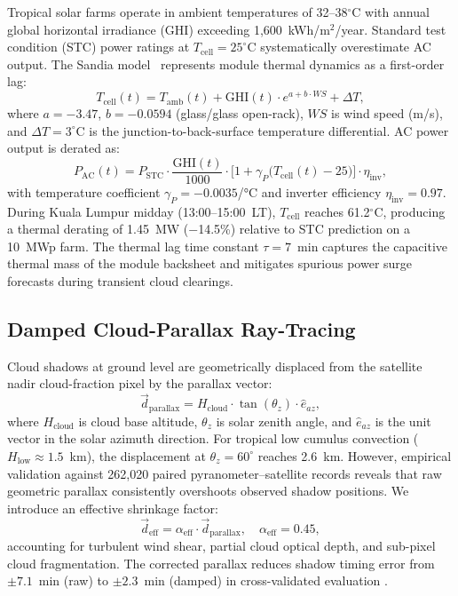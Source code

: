 \documentclass[conference]{IEEEtran}
\begin{document}
Tropical solar farms operate in ambient temperatures of 32--38$^{\circ}$C with
annual global horizontal irradiance (GHI) exceeding 1,600~kWh/m$^2$/year.
Standard test condition (STC) power ratings at $T_{\mathrm{cell}}=25^{\circ}$C
systematically overestimate AC output. The Sandia model~\cite{b1} represents
module thermal dynamics as a first-order lag:
\begin{equation}
  T_{\mathrm{cell}}(t) = T_{\mathrm{amb}}(t)
    + \mathrm{GHI}(t)\cdot e^{a + b\cdot WS} + \Delta T,
  \label{eq:tcell}
\end{equation}
where $a=-3.47$, $b=-0.0594$ (glass/glass open-rack), $WS$ is wind speed
(m/s), and $\Delta T=3^{\circ}$C is the junction-to-back-surface temperature
differential. AC power output is derated as:
\begin{equation}
  P_{\mathrm{AC}}(t) = P_{\mathrm{STC}}\cdot\frac{\mathrm{GHI}(t)}{1000}
    \cdot\bigl[1 + \gamma_P\bigl(T_{\mathrm{cell}}(t)-25\bigr)\bigr]
    \cdot\eta_{\mathrm{inv}},
  \label{eq:pac}
\end{equation}
with temperature coefficient $\gamma_P=-0.0035$/°C and inverter efficiency
$\eta_{\mathrm{inv}}=0.97$. During Kuala Lumpur midday (13:00--15:00~LT),
$T_{\mathrm{cell}}$ reaches 61.2$^{\circ}$C, producing a thermal derating of
1.45~MW ($-$14.5\%) relative to STC prediction on a 10~MWp farm. The thermal
lag time constant $\tau=7$~min captures the capacitive thermal mass of the
module backsheet and mitigates spurious power surge forecasts during transient
cloud clearings.

\subsection{Damped Cloud-Parallax Ray-Tracing}

Cloud shadows at ground level are geometrically displaced from the satellite
nadir cloud-fraction pixel by the parallax vector:
\begin{equation}
  \vec{d}_{\mathrm{parallax}}
    = H_{\mathrm{cloud}}\cdot\tan(\theta_z)\cdot\hat{e}_{az},
  \label{eq:parallax}
\end{equation}
where $H_{\mathrm{cloud}}$ is cloud base altitude, $\theta_z$ is solar zenith
angle, and $\hat{e}_{az}$ is the unit vector in the solar azimuth direction.
For tropical low cumulus convection ($H_{\mathrm{low}}\approx1.5$~km), the
displacement at $\theta_z=60^{\circ}$ reaches 2.6~km. However, empirical
validation against 262,020 paired pyranometer--satellite records reveals that
raw geometric parallax consistently overshoots observed shadow positions. We
introduce an effective shrinkage factor:
\begin{equation}
  \vec{d}_{\mathrm{eff}}
    = \alpha_{\mathrm{eff}}\cdot\vec{d}_{\mathrm{parallax}},
    \quad \alpha_{\mathrm{eff}} = 0.45,
  \label{eq:deff}
\end{equation}
accounting for turbulent wind shear, partial cloud optical depth, and sub-pixel
cloud fragmentation. The corrected parallax reduces shadow timing error from
$\pm7.1$~min (raw) to $\pm2.3$~min (damped) in cross-validated evaluation
\cite{b5}.
\end{document}
